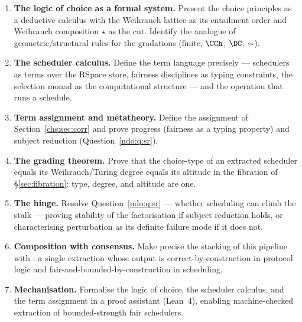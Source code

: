 \begin{enumerate}[label=P\arabic*.,leftmargin=2.4em]
\item \textbf{The logic of choice as a formal system.} Present the choice principles as a deductive calculus with
the Weihrauch lattice \cite{weihrauch} as its entailment order and Weihrauch composition $\star$ as the cut. Identify
the analogue of geometric/structural rules for the gradations (finite, $\CCh$, $\DC$, $\AC$).
\item \textbf{The scheduler calculus.} Define the term language precisely --- schedulers as terms over the RSpace
store, fairness disciplines as typing constraints, the selection monad \cite{escardo} as the computational structure
--- and the operation that runs a schedule.
\item \textbf{Term assignment and metatheory.} Define the assignment of Section~\ref{chs:sec:corr} and prove progress
(fairness as a typing property) and subject reduction (Question~\ref{ndo:q:sr}).
\item \textbf{The grading theorem.} Prove that the choice-type of an extracted scheduler equals its
Weihrauch/Turing degree equals its altitude in the fibration of \S\ref{sec:fibration}: type, degree, and altitude are one.
\item \textbf{The hinge.} Resolve Question~\ref{ndo:q:sr} --- whether scheduling can climb the stalk --- proving stability
of the factorisation if subject reduction holds, or characterising perturbation as its definite failure mode if it does
not.
\item \textbf{Composition with consensus.} Make precise the stacking of this pipeline with \cite{consensus}: a single
extraction whose output is correct-by-construction in protocol logic and fair-and-bounded-by-construction in scheduling.
\item \textbf{Mechanisation.} Formalise the logic of choice, the scheduler calculus, and the term assignment in a proof
assistant (Lean~4), enabling machine-checked extraction of bounded-strength fair schedulers.
\end{enumerate}


